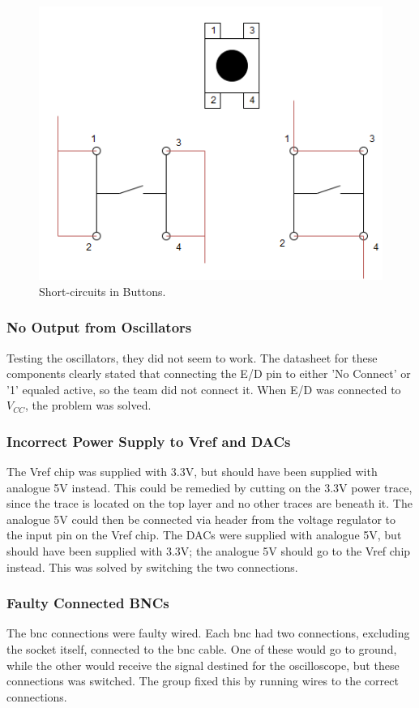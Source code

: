 \begin{figure}[h!]
\centering
\includegraphics[scale=0.5]{images/Button_Issue.png}
\caption{Short-circuits in Buttons.}
\label{fig:Button Issue}
\end{figure}

\subsubsection{No Output from Oscillators}
Testing the oscillators, they did not seem to work.
The datasheet for these components clearly stated that connecting the E/D pin to either 'No Connect' or '1' equaled active, so the team did not connect it.
When E/D was connected to \(V_{CC}\), the problem was solved.

\subsubsection{Incorrect Power Supply to Vref and DACs}
The Vref chip was supplied with 3.3V, but should have been supplied with analogue 5V instead.
This could be remedied by cutting on the 3.3V power trace, since the trace is located on the top layer and no other traces are beneath it.
The analogue 5V could then be connected via header from the voltage regulator to the input pin on the Vref chip.
\newline
The DACs were supplied with analogue 5V, but should have been supplied with 3.3V; the analogue 5V should go to the Vref chip instead.
This was solved by switching the two connections.

\subsubsection{Faulty Connected BNCs}
The \gls{bnc} connections were faulty wired.
Each \gls{bnc} had two connections, excluding the socket itself, connected to the \gls{bnc} cable.
One of these would go to ground, while the other would receive the signal destined for the oscilloscope, but these connections was switched.
The group fixed this by running wires to the correct connections.

